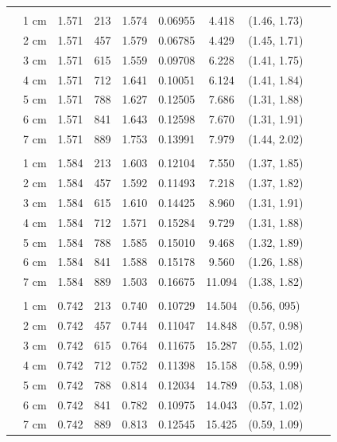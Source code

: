 \documentclass[a4paper 12pt]{article}
\numberwithin{equation}{section}
\begin{document}
\begin{small}
\begin{table}[h!]
\begin{footnotesize}
\begin{tabular}{clclclclcl}
 \raisebox{1ex}{\bf age 3}  \\ [1.0ex]
&   1 cm & 1.571 &  213 &  1.574  &          0.06955& 4.418  & (1.46, 1.73)\\
&   2 cm & 1.571 &  457 &  1.579  &          0.06785& 4.429  & (1.45, 1.71)\\
&   3 cm & 1.571 &  615 &  1.559  &          0.09708& 6.228  & (1.41, 1.75)\\
&   4 cm & 1.571 &  712 &  1.641  &          0.10051& 6.124  & (1.41, 1.84)\\
&   5 cm & 1.571 &  788 &  1.627  &          0.12505& 7.686  & (1.31, 1.88)\\
&   6 cm & 1.571 &  841 &  1.643  &          0.12598& 7.670  & (1.31, 1.91)\\
&   7 cm & 1.571 &  889 &  1.753  &          0.13991& 7.979  & (1.44, 2.02) \\[1.5ex]

 \raisebox{1ex}{\bf age 4}  \\ [1.0ex]
&   1 cm & 1.584 &  213 &  1.603  &          0.12104& 7.550  & (1.37, 1.85)\\
&   2 cm & 1.584 &  457 &  1.592  &          0.11493& 7.218  & (1.37, 1.82)\\
&   3 cm & 1.584 &  615 &  1.610  &          0.14425& 8.960  & (1.31, 1.91)\\
&   4 cm & 1.584 &  712 &  1.571  &          0.15284& 9.729  & (1.31, 1.88)\\
&   5 cm & 1.584 &  788 &  1.585  &          0.15010& 9.468  & (1.32, 1.89)\\
&   6 cm & 1.584 &  841 &  1.588  &          0.15178& 9.560  & (1.26, 1.88)\\
&   7 cm & 1.584 &  889 &  1.503  &          0.16675& 11.094 & (1.38, 1.82) \\[1.5ex]

 \raisebox{1ex}{\bf age 5}  \\ [1.0ex]
&   1 cm & 0.742 &  213 &  0.740 &           0.10729& 14.504 & (0.56, 095)\\
&   2 cm & 0.742 &  457 &  0.744 &           0.11047& 14.848 & (0.57, 0.98)\\
&   3 cm & 0.742 &  615 &  0.764 &           0.11675& 15.287 & (0.55, 1.02)\\
&   4 cm & 0.742 &  712 &  0.752 &           0.11398& 15.158 & (0.58, 0.99)\\
&   5 cm & 0.742 &  788 &  0.814 &           0.12034& 14.789 & (0.53, 1.08)\\
&   6 cm & 0.742 &  841 &  0.782 &           0.10975& 14.043 & (0.57, 1.02)\\
&   7 cm & 0.742 &  889 &  0.813 &           0.12545& 15.425 & (0.59, 1.09) \\[1.5ex]


\end{tabular}
\end{footnotesize}
\end{table}
\end{small}
\end{document}
